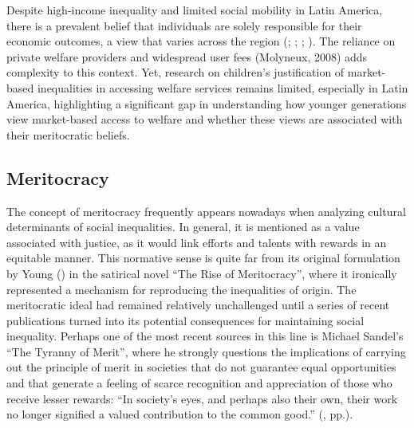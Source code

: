 \documentclass[
  letterpaper,
  DIV=11,
  numbers=noendperiod]{scrartcl}
\begin{document}
Despite high-income inequality and limited social mobility in Latin
America, there is a prevalent belief that individuals are solely
responsible for their economic outcomes, a view that varies across the
region
(;
;
;
).
The reliance on private welfare providers and widespread user fees
(Molyneux, 2008) adds complexity to this context. Yet, research on
children's justification of market-based inequalities in accessing
welfare services remains limited, especially in Latin America,
highlighting a significant gap in understanding how younger generations
view market-based access to welfare and whether these views are
associated with their meritocratic beliefs.~

\subsection{Meritocracy}\label{meritocracy}

The concept of meritocracy frequently appears nowadays when analyzing
cultural determinants of social inequalities. In general, it is
mentioned as a value associated with justice, as it would link efforts
and talents with rewards in an equitable manner. This normative sense is
quite far from its original formulation by Young
() in the satirical novel ``The Rise
of Meritocracy'', where it ironically represented a mechanism for
reproducing the inequalities of origin. The meritocratic ideal had
remained relatively unchallenged until a series of recent publications
turned into its potential consequences for maintaining social
inequality. Perhaps one of the most recent sources in this line is
Michael Sandel's ``The Tyranny of Merit'', where he strongly questions
the implications of carrying out the principle of merit in societies
that do not guarantee equal opportunities and that generate a feeling of
scarce recognition and appreciation of those who receive lesser rewards:
``In society's eyes, and perhaps also their own, their work no longer
signified a valued contribution to the common good.''
(, pp.).
\end{document}

